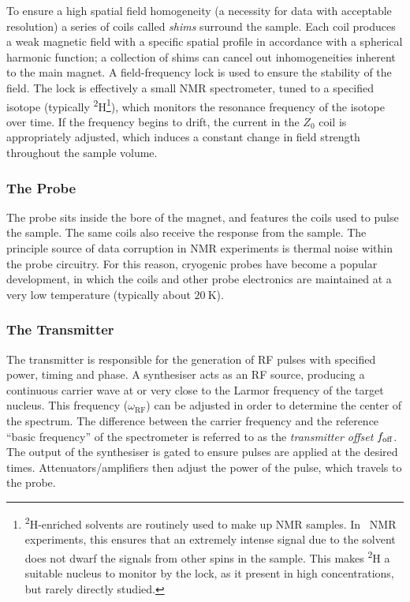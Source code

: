 To ensure a high spatial field homogeneity (a necessity for data with
acceptable resolution) a series of coils called \textit{shims} surround the
sample. Each coil produces a weak magnetic field with a specific spatial
profile in accordance with a spherical harmonic function; a collection of shims
can cancel out inhomogeneities inherent to the main magnet.
A field-frequency lock is used to ensure the stability of the
field. The lock is effectively a small \ac{NMR} spectrometer, tuned to a
specified isotope (typically \textsuperscript{2}H\footnote{
    \textsuperscript{2}H-enriched solvents are routinely used to make up
    \ac{NMR} samples. In \proton\ \ac{NMR} experiments, this ensures that an
    extremely intense signal due to the solvent does not dwarf the signals from
    other spins in the sample. This makes \textsuperscript{2}H a suitable
    nucleus to monitor by the lock, as it present in high concentrations, but
    rarely directly studied.
}), which monitors the resonance frequency of the isotope over
time. If the frequency begins to drift, the current in the $Z_0$ coil is
appropriately adjusted, which induces a constant change in field strength
throughout the sample volume.

\subsubsection{The Probe}
The probe sits inside the bore of the magnet, and features the coils used to
pulse the sample.
The same coils also receive the response from the sample. The principle source
of data corruption in \ac{NMR} experiments is thermal noise within the probe
circuitry.  For this reason, cryogenic probes have become a popular
development, in which the coils and other probe electronics are maintained at a
very low temperature (typically about $\qty{20}{\kelvin}$)\cite{Kovacs2020}.

\subsubsection{The Transmitter}
The transmitter is responsible for the generation of \ac{RF} pulses
with specified power, timing and phase.
A synthesiser acts as an \ac{RF} source, producing a continuous carrier wave at
or very close to the Larmor frequency of the target nucleus. This frequency
($\omega_{\text{RF}}$) can be adjusted in order to determine the center of the
spectrum. The difference between the carrier frequency and the reference
``basic frequency'' of the spectrometer is referred to as the \emph{transmitter
offset} $f_{\text{off}}$.  The output of the synthesiser is gated to ensure pulses are
applied at the desired times. Attenuators/amplifiers then adjust the power
of the pulse, which travels to the probe.


